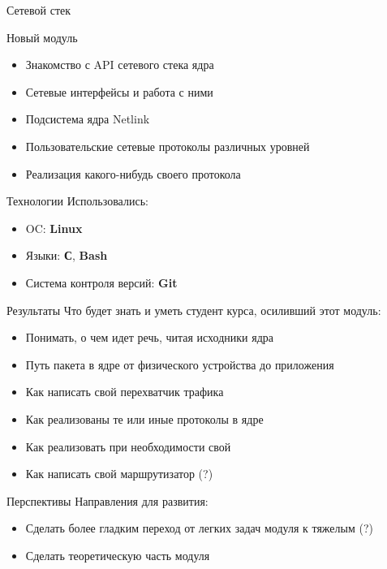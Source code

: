 \documentclass{beamer}
\begin{document}
\begin{frame}{Сетевой стек}
\end{frame}

\begin{frame}{Новый модуль}
	\begin{itemize}
		\item Знакомство с API сетевого стека ядра
		\item Сетевые интерфейсы и работа с ними
		\item Подсистема ядра Netlink
		\item Пользовательские сетевые протоколы различных уровней
		\item Реализация какого-нибудь своего протокола
	\end{itemize}
\end{frame}

\begin{frame}{Технологии}
        Использовались:
	\begin{itemize}
		\item OC: \textbf{Linux}
		\item Языки: \textbf{С}, \textbf{Bash}
		\item Система контроля версий: \textbf{Git}
	\end{itemize}
\end{frame}

\begin{frame}{Результаты}
        Что будет знать и уметь студент курса, осиливший этот модуль:
	\begin{itemize}
		\item Понимать, о чем идет речь, читая исходники ядра
		\item Путь пакета в ядре от физического устройства до приложения
		\item Как написать свой перехватчик трафика
		\item Как реализованы те или иные протоколы в ядре
		\item Как реализовать при необходимости свой
                \item Как написать свой маршрутизатор (?)
	\end{itemize}
\end{frame}

\begin{frame}{Перспективы}
	Направления для развития:
	\begin{itemize}
                \item Сделать более гладким переход от легких задач модуля к тяжелым (?)
                \item Сделать теоретическую часть модуля
	\end{itemize}
\end{frame}
\end{document}
